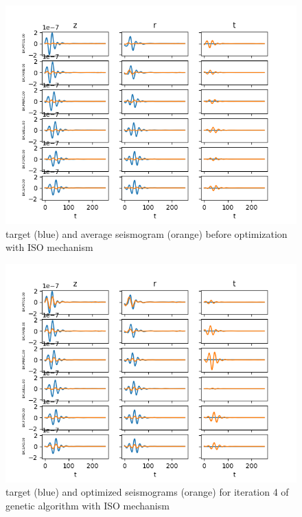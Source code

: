 \documentclass{article}
\begin{document}
\begin{figure}[H]
	\centering
	\includegraphics{dataSet2/plots/optimized0.png}
	\caption{target (blue) and average seismogram (orange) before optimization with ISO mechanism}
	\label{convergenceISO1}
\end{figure}
\begin{figure}[H]
	\centering
	\includegraphics{dataSet2/plots/optimized3.png}
	\caption{target (blue) and optimized seismograms (orange) for iteration 4 of genetic algorithm with ISO mechanism}
	\label{convergenceISO2}
\end{figure}
\end{document}
